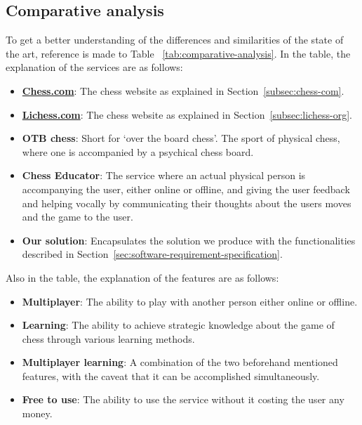 \subsection{Comparative analysis}\label{subsec:comparative-analysis}

To get a better understanding of the differences and similarities of the state of the art, reference is made to Table
~\ref{tab:comparative-analysis}.
In the table, the explanation of the services are as follows:

\begin{itemize}
    \item \textbf{\url{Chess.com}}: The chess website as explained in Section~\ref{subsec:chess-com}.
    \item \textbf{\url{Lichess.com}}: The chess website as explained in Section~\ref{subsec:lichess-org}.
    \item \textbf{OTB chess}: Short for `over the board chess'.
    The sport of physical chess, where one is accompanied by a psychical chess board.
    \item \textbf{Chess Educator}: The service where an actual physical person is accompanying the user, either online
    or offline, and giving the user feedback and helping vocally by communicating their thoughts about the users moves
    and the game to the user.
    \item \textbf{Our solution}: Encapsulates the solution we produce with the functionalities described in
    Section~\ref{sec:software-requirement-specification}.
\end{itemize}

Also in the table, the explanation of the features are as follows:

\begin{itemize}
    \item \textbf{Multiplayer}: The ability to play with another person either online or offline.
    \item \textbf{Learning}: The ability to achieve strategic knowledge about the game of chess through various learning
    methods.
    \item \textbf{Multiplayer learning}: A combination of the two beforehand mentioned features, with the caveat that it
    can be accomplished simultaneously.
    \item \textbf{Free to use}: The ability to use the service without it costing the user any money.
\end{itemize}

